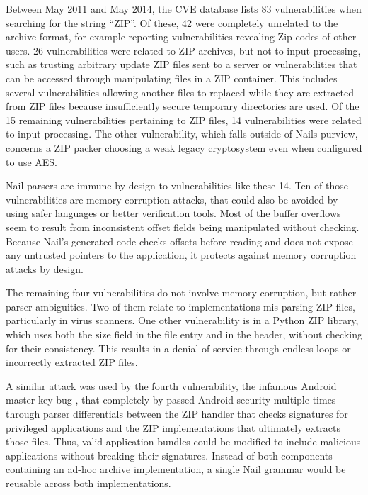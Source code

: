 Between May 2011 and May 2014, the CVE database\cite{cve-database} lists 83 vulnerabilities when searching for the
string ``ZIP''. Of these, 42 were completely unrelated to the archive format, for example reporting
vulnerabilities revealing Zip codes of other users. 26 vulnerabilities were related to ZIP archives,
but not to input processing, such as trusting arbitrary update ZIP files sent to a server or
vulnerabilities that can be accessed through manipulating files in a ZIP container. This includes
several vulnerabilities allowing another files to replaced while they are extracted from ZIP
files because insufficiently secure temporary directories are used. Of the 15 remaining
vulnerabilities pertaining to ZIP files, 14 vulnerabilities were related to input processing. The
 other vulnerability, which falls outside of Nails purview, concerns a ZIP packer choosing a weak
 legacy cryptosystem even when configured to use AES.

 Nail parsers are immune by design to vulnerabilities like these 14. Ten of those vulnerabilities
 are memory corruption attacks, that could also be avoided by using safer languages or better
 verification tools. Most of the buffer overflows seem to result from inconsistent offset fields
 being manipulated without checking. Because Nail's generated code checks offsets before reading and
 does not expose any untrusted pointers to the application, it protects against memory corruption
 attacks by design.

The remaining four vulnerabilities do not involve memory corruption, but rather parser ambiguities.
Two of them relate to implementations mis-parsing ZIP files, particularly in virus scanners. One
other vulnerability is in a Python ZIP library, which uses both the size field in the file entry and
in the header, without checking for their consistency. This results in a denial-of-service through
endless loops or incorrectly extracted ZIP files.

A similar attack was used by the fourth vulnerability, the infamous Android master key bug
\cite{saurik-masterkey}, that completely by-passed Android security multiple times through parser
differentials between the ZIP handler that checks signatures for privileged applications and the ZIP
implementations that ultimately extracts those files. Thus, valid  application bundles could be
modified to include malicious applications without breaking their signatures. Instead of both
components containing an ad-hoc archive implementation, a single Nail grammar would be reusable
across both implementations. 

